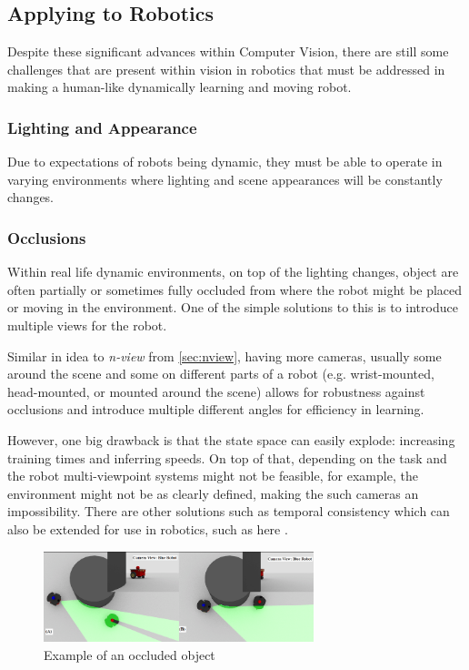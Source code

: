   \subsection{Applying to Robotics}
    Despite these significant advances within Computer Vision, there are still some challenges that are present within vision in robotics that must be addressed in making a human-like dynamically learning and moving robot.

    \subsubsection{Lighting and Appearance}
      Due to expectations of robots being dynamic, they must be able to operate in varying environments where lighting and scene appearances will be constantly changes.

    \subsubsection{Occlusions}
      Within real life dynamic environments, on top of the lighting changes, object are often partially or sometimes fully occluded from where the robot might be placed or moving in the environment.  One of the simple solutions to this is to introduce multiple views for the robot. 
      
      Similar in idea to \emph{n-view} from \ref{sec:nview}, having more cameras, usually some around the scene and some on different parts of a robot (e.g. wrist-mounted, head-mounted, or mounted around the scene) allows for robustness against occlusions and introduce multiple different angles for efficiency in learning. 

      However, one big drawback is that the state space can easily explode: increasing training times and inferring speeds. On top of that, depending on the task and the robot multi-viewpoint systems might not be feasible, for example, the environment might not be as clearly defined, making the such cameras an impossibility. There are other solutions such as temporal consistency \cite{lai2018learningblindvideotemporal} which can also be extended for use in robotics, such as here \cite{billington2007using, yang2021reactive}.

      \begin{figure}[h]
        \centering
        \includegraphics[width=0.7\textwidth]{assets/background/occlusion.png}
        \caption{Example of an occluded object \cite{occlusionimage}}\label{fig:occlusion}
      \end{figure}

